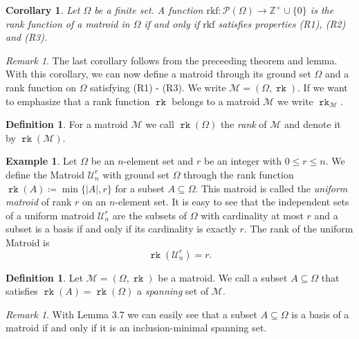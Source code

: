 \documentclass[12pt,a4paper, twoside, autooneside=false]{scrartcl}
\newtheorem{korollar}[theorem]{Corollary}
\theoremstyle{definition}
\newtheorem{definition}[theorem]{Definition}
\newtheorem{beispiel}[theorem]{Example}
\theoremstyle{remark}
\newtheorem{remark}[theorem]{Remark}
\numberwithin{equation}{section}
\DeclareMathOperator{\rk}{\mathtt{rk}}
\newcommand{\M}{\mathcal{M}} %
\begin{document}
\begin{korollar}
Let $\Omega$ be a finite set. A function $\mathrm{rkf} :  \mathcal{P}(\Omega) \to \mathbb{Z}^+ \cup \{0\}$ is the rank function of a matroid in $\Omega$ if and only if $\mathrm{rkf}$ satisfies properties (R1), (R2) and (R3). 
\end{korollar}
\begin{remark}
The last corollary follows from the preceeding theorem and lemma. With this corollary, we can now define a matroid through its ground set $\Omega$ and a rank function on $\Omega$ satisfying (R1) - (R3). We write $\M = (\Omega, \rk)$. If we want to emphasize that a rank function $\rk$ belongs to a matroid $\M$ we write $\rk_\M$. 
\end{remark}
\begin{definition}
For a matroid $\M$ we call $\rk(\Omega)$ the \textit{rank} of $\M$ and denote it by $\rk(\M)$. 
\end{definition}	
\begin{beispiel} 
Let $\Omega$ be an $n$-element set and $r$ be an integer with $0 \leq r \leq n$. We define the Matroid $\mathcal{U}_{n}^r$ with ground set $\Omega$ through the rank function $\rk(A) \coloneqq \min\{|A|, r\}$ for a subset $A \subseteq \Omega$. This matroid is called the \textit{uniform matroid} of rank $r$ on an $n$-element set. It is easy to see that the independent sets of a uniform matroid $\mathcal{U}_n^r$ are the subsets of $\Omega$ with cardinality at most $r$ and a subset is a basis if and only if its cardinality is exactly $r$. The rank of the uniform Matroid is 
\[
\rk(\mathcal{U}_n^r) = r.
\]
\end{beispiel} 
\begin{definition}
Let $\M = (\Omega, \rk)$ be a matroid. We call a subset $A \subseteq \Omega$ that satisfies $\rk(A) = \rk(\Omega)$ a \textit{spanning} set of $\M$. 
\end{definition}
\begin{remark} 
With Lemma 3.7 we can easily see that a subset $A \subseteq \Omega$ is a basis of a matroid if and only if it is an inclusion-minimal spanning set.  
\end{remark}
\end{document}
